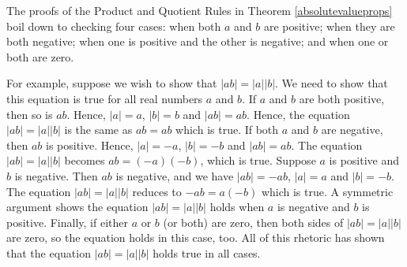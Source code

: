 \medskip


\medskip

The proofs of the Product and Quotient Rules in Theorem \ref{absolutevalueprops} boil down to checking four cases:  when both $a$ and $b$ are positive;  when they are both negative;  when one is positive and the other is negative; and when one or both are zero.  

\medskip

For example, suppose we wish to show that $|ab| = |a||b|$.  We need to show that this equation is true for all real numbers $a$ and $b$.  If $a$ and $b$ are both positive, then so is $ab$.  Hence, $|a| = a$, $|b| = b$ and $|ab| = ab$.  Hence, the equation $|ab| = |a||b|$ is the same as $ab = ab$ which is true.  If both $a$ and $b$ are negative, then $ab$ is positive.  Hence, $|a| = -a$, $|b| = -b$ and $|ab| = ab$.  The equation $|ab| = |a||b|$ becomes $ab = (-a)(-b)$, which is true.  Suppose $a$ is positive and $b$ is negative. Then $ab$ is negative, and we have $|ab| = -ab$, $|a| = a$ and $|b| = -b$.  The equation $|ab| = |a||b|$ reduces to $-ab = a(-b)$ which is true.  A symmetric argument shows the equation $|ab| = |a||b|$ holds when $a$ is negative and $b$ is positive.  Finally, if either $a$ or $b$ (or both) are zero, then both sides of $|ab| = |a||b|$ are zero, so the equation holds in this case, too.  All of this rhetoric has shown that the equation $|ab| = |a||b|$ holds true in all cases.  

